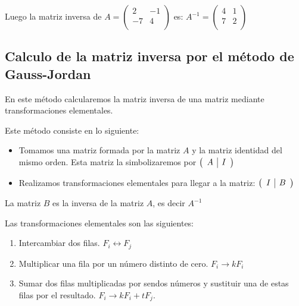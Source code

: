 \begin{ejemplo}
Luego la matriz inversa de $A=\begin{pmatrix} 
 2& -1 \\
 -7& 4 \\
\end{pmatrix}$ es:
$A^{-1}= \begin{pmatrix}
 4& 1 \\
 7& 2 \\
\end{pmatrix}$
\end{ejemplo}

\subsection{Calculo de la matriz inversa por el método de Gauss-Jordan}

En este método calcularemos la matriz inversa de una matriz mediante transformaciones elementales.

Este método consiste en lo siguiente:

\begin{itemize}
\item Tomamos una matriz formada por la matriz $A$ y la matriz identidad del mismo orden. Esta matriz la simbolizaremos por $\left( \begin{array}{c | c}
A &  I 
\end{array} \right) $
\item Realizamos transformaciones elementales para llegar a la matriz: $\left( \begin{array}{c | c} I & B 
\end{array} \right) $
\end{itemize}

La matriz $B$ es la inversa de la matriz $A$, es decir $A^{-1}$


Las transformaciones elementales son las siguientes:

\begin{enumerate}
\item Intercambiar dos filas. $F_i \leftrightarrow F_j$
\item Multiplicar una fila por un número distinto de cero. $F_i \rightarrow kF_i$
\item Sumar dos filas multiplicadas por sendos números y sustituir una de estas filas por el resultado. $F_i \rightarrow kF_i+tF_j$.
\end{enumerate}

